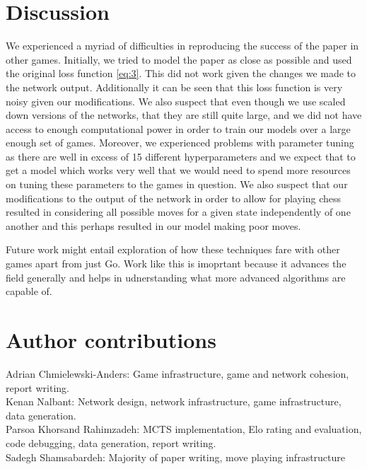 \documentclass[english]{article}
\begin{document}

\section{Discussion}
We experienced a myriad of difficulties in reproducing the success of the paper
in other games.
Initially, we tried to model the paper as close as possible and used the
original loss function \ref{eq:3}. This did not work given the changes we made
to the network output. Additionally it can be seen that this loss function is
very noisy given our modifications.
We also suspect that even though we use scaled down versions of the networks,
that they are still quite large, and we did not have access to enough
computational power in order to train our models over a large enough set of
games. Moreover, we experienced problems with parameter tuning as there are well
in excess of 15 different hyperparameters and we expect that to get a model
which works very well that we would need to spend more resources on tuning these
parameters to the games in question. We also suspect that our modifications to
the output of the network in order to allow for playing chess resulted in
considering all possible moves for a given state independently of one another
and this perhaps resulted in our model making poor moves.

Future work might entail exploration of how these techniques fare with other
games apart from just Go. Work like this is imoprtant because it advances the
field generally and helps in udnerstanding what more advanced algorithms are
capable of.

\clearpage



\section{Author contributions}
Adrian Chmielewski-Anders: Game infrastructure, game and network cohesion, report writing.\\
Kenan Nalbant: Network design, network infrastructure, game infrastructure, data generation.\\
Parsoa Khorsand Rahimzadeh: MCTS implementation, Elo rating and evaluation, code debugging, data generation, report writing.\\
Sadegh Shamsabardeh: Majority of paper writing, move playing infrastructure
\end{document}
